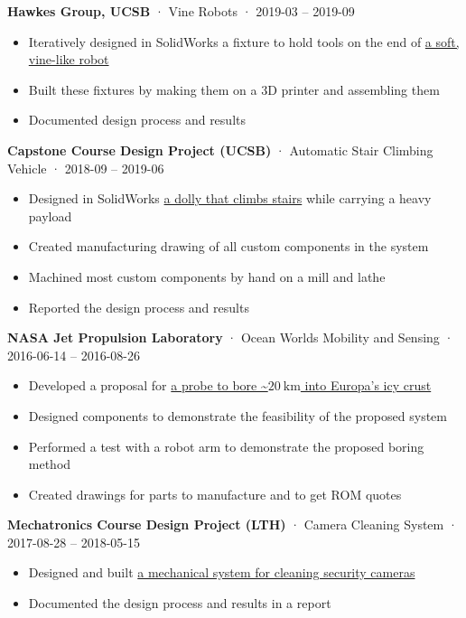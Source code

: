 \documentclass[12pt, oneside]{article}
\newcommand{\jobtitle}[3] {
	{\bf #1} · {#2} · {#3} \vspace{-7pt} \\
}
\begin{document}
\begin{flushleft}
\jobtitle{Hawkes Group, UCSB}{Vine Robots}{2019-03 – 2019-09}
\begin{itemize}
	\item Iteratively designed in SolidWorks a fixture to hold tools on the end of \href{https://portfolium.com/entry/vine-robot-tool-mount}{a soft, vine-like robot}
	\item Built these fixtures by making them on a 3D printer and assembling them 
	\item Documented design process and results
\end{itemize}

\jobtitle{Capstone Course Design Project (UCSB)}{Automatic Stair Climbing Vehicle}{2018-09 – 2019-06}
\begin{itemize}
	\item Designed in SolidWorks \href{https://portfolium.com/entry/automatic-stair-climbing-vehicle}{a dolly that climbs stairs} while carrying a heavy payload
	\item Created manufacturing drawing of all custom components in the system
	\item Machined most custom components by hand on a mill and lathe
	\item Reported the design process and results
\end{itemize}

\jobtitle{NASA Jet Propulsion Laboratory}{Ocean Worlds Mobility and Sensing}{2016-06-14 – 2016-08-26}
\begin{itemize}
	\item Developed a proposal for \href{https://portfolium.com/entry/owms-deep-subsurface-access-level-wind}{a probe to bore \textasciitilde$\SI{20}{\kilo\meter}$ into Europa's icy crust}
	\item Designed components to demonstrate the feasibility of the proposed system
	\item Performed a test with a robot arm to demonstrate the proposed boring method
	\item Created drawings for parts to manufacture and to get ROM quotes
\end{itemize}

\jobtitle{Mechatronics Course Design Project (LTH)}{Camera Cleaning System}{2017-08-28 – 2018-05-15}
\begin{itemize}
	\item Designed and built \href{https://portfolium.com/entry/automatic-security-camera-lens-cleaner}{a mechanical system for cleaning security cameras}
	\item Documented the design process and results in a report
\end{itemize}


\end{flushleft}
\end{document}
